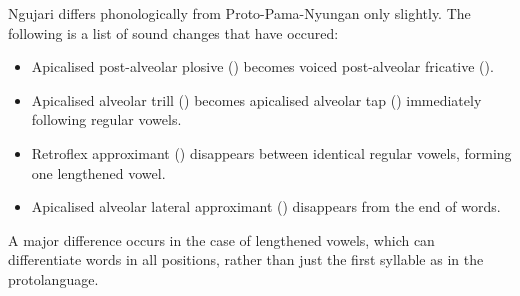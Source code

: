 Ngujari differs phonologically from Proto-Pama-Nyungan only slightly. The
following is a list of sound changes that have occured:

\begin{itemize}
\item Apicalised post-alveolar plosive () becomes
  voiced post-alveolar fricative ().
\item Apicalised alveolar trill (\textipa{\|]r}) becomes apicalised alveolar tap
  (\textipa{\|]R}) immediately following regular vowels.
\item Retroflex approximant (\textipa{\textturnrrtail}) disappears between
  identical regular vowels, forming one lengthened vowel.
\item Apicalised alveolar lateral approximant (\textipa{\|]l}) disappears from
  the end of words.
\end{itemize}

A major difference occurs in the case of lengthened vowels, which can
differentiate words in all positions, rather than just the first syllable as in
the protolanguage.
